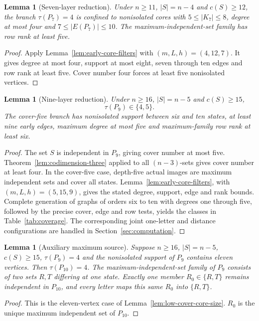 \documentclass[11pt]{article}
\newtheorem{lemma}[theorem]{Lemma}
\theoremstyle{definition}
\theoremstyle{plain}
\begin{document}
\begin{lemma}[Seven-layer reduction]\label{lem:seven-layer-reduction}
Under $n\ge11$, $|S|=n-4$ and $c(S)\ge12$,
the branch $\tau(P_7)=4$ is confined to nonisolated cores
with $5\le |K_7|\le8$, degree at most four and
$7\le|E(P_7)|\le10$. The maximum-independent-set family has row rank at least five.
\end{lemma}
\begin{proof}
Apply Lemma~\ref{lem:early-core-filters} with $(m,L,h)=(4,12,7)$.
It gives degree at most four, support at most eight, seven through
ten edges and row rank at least five. Cover number four forces
at least five nonisolated vertices.
\end{proof}

\begin{lemma}[Nine-layer reduction]\label{lem:nine-layer-reduction}
Under $n\ge16$, $|S|=n-5$ and $c(S)\ge15$,
\[
  \tau(P_9)\in\{4,5\}.
\]
The cover-five branch has nonisolated support between
six and ten states, at least nine early edges,
maximum degree at most five and maximum-family row
rank at least six.
\end{lemma}
\begin{proof}
The set $S$ is independent in $P_9$, giving cover number
at most five. Theorem~\ref{lem:codimension-three}
applied to all $(n-3)$-sets gives cover number at least
four. In the cover-five case, depth-five actual images
are maximum independent sets and cover all states.
Lemma~\ref{lem:early-core-filters}, with $(m,L,h)=(5,15,9)$,
gives the stated degree, support, edge and rank bounds. Complete generation of graphs of
orders six to ten with degrees one through five, followed
by the precise cover, edge and row tests, yields
the classes in Table~\ref{tab:coverage}. The corresponding joint
one-letter and distance configurations are handled in
Section~\ref{sec:computation}.
\end{proof}

\begin{lemma}[Auxiliary maximum source]\label{lem:auxiliary-source}
Suppose $n\ge16$, $|S|=n-5$, $c(S)\ge15$,
$\tau(P_9)=4$ and the nonisolated support of $P_9$
contains eleven vertices. Then $\tau(P_{10})=4$.
The maximum-independent-set family of $P_9$ consists
of two sets $R,T$ differing at one state. Exactly one
member $R_0\in\{R,T\}$ remains independent in $P_{10}$,
and every letter maps this same $R_0$
into $\{R,T\}$.
\end{lemma}
\begin{proof}
This is the eleven-vertex case of Lemma~\ref{lem:low-cover-core-size}.
$R_0$ is the unique maximum independent set of $P_{10}$.
\end{proof}
\end{document}
